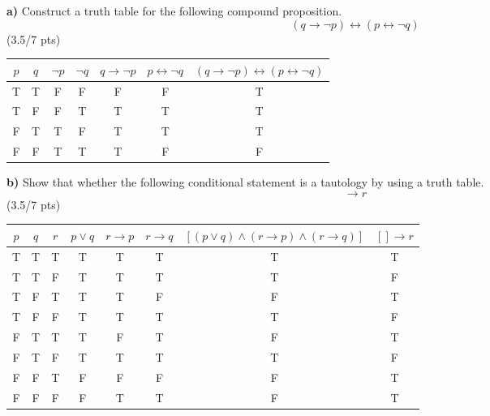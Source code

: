 \documentclass[a4paper,12pt]{article}
\newcommand\tab[1][1cm]{\hspace*{#1}}
\begin{document}
\tab \textbf{a)} Construct a truth table for the following compound proposition.
\begin{equation*}
    (q \rightarrow \neg p)\leftrightarrow (p \leftrightarrow \neg q)
\end{equation*} 
\hfill \small{(3.5/7 pts)} \\
\begin{tcolorbox}
\begin{table}[H]
    \centering
    \begin{tabular}{c|c|c|c|c|c|c}
    $p$ & $q$ & $\neg p$ & $\neg q$ & $q \rightarrow \neg p$ & $p \leftrightarrow \neg q$ & $(q \rightarrow \neg p)\leftrightarrow (p \leftrightarrow \neg q)$ \\
    \hline
    T & T & F & F & F & F & T\\
    T & F & F & T & T & T & T\\
    F & T & T & F & T & T & T\\
    F & F & T & T & T & F & F
    \end{tabular}
    \end{table}
\end{tcolorbox}
\newpage
\tab \textbf{b)} Show that whether the following conditional statement is a tautology by using a truth table.
\begin{equation*}
    [(p \vee q) \wedge (r \rightarrow p) \wedge (r \rightarrow q)] \rightarrow r
\end{equation*}
\hfill \small{(3.5/7 pts)}\\
\begin{tcolorbox}
\begin{table}[H]
    \centering
    \begin{tabular}{c|c|c|c|c|c|c|c}
    \hline
    $p$ & $q$ & $r$ & $p \vee q$ & $r \rightarrow p$ & $r \rightarrow q$ & $[(p \vee q) \wedge (r \rightarrow p) \wedge (r \rightarrow q)]$ & $[ ] \rightarrow r$ \\
    \hline
    T & T & T & T & T & T & T & T \\
    T & T & F & T & T & T & T & F \\
    T & F & T & T & T & F & F & T \\
    T & F & F & T & T & T & T & F \\
    F & T & T & T & F & T & F & T \\
    F & T & F & T & T & T & T & F \\
    F & F & T & F & F & F & F & T \\
    F & F & F & F & T & T & F & T
    \end{tabular}
\end{table}
\end{tcolorbox}
\end{document}
